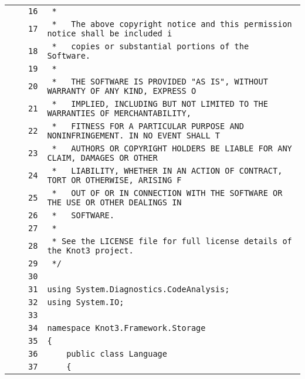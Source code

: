 \documentclass[a4paper,10pt]{article}
\begin{document}
\begin{longtable}[l]{lrrl}
\cellcolor{gray} &  & \verb~16~ & \verb~ *~\\
\cellcolor{gray} &  & \verb~17~ & \verb~ *   The above copyright notice and this permission notice shall be included i~\\
\cellcolor{gray} &  & \verb~18~ & \verb~ *   copies or substantial portions of the Software.~\\
\cellcolor{gray} &  & \verb~19~ & \verb~ *~\\
\cellcolor{gray} &  & \verb~20~ & \verb~ *   THE SOFTWARE IS PROVIDED "AS IS", WITHOUT WARRANTY OF ANY KIND, EXPRESS O~\\
\cellcolor{gray} &  & \verb~21~ & \verb~ *   IMPLIED, INCLUDING BUT NOT LIMITED TO THE WARRANTIES OF MERCHANTABILITY,~\\
\cellcolor{gray} &  & \verb~22~ & \verb~ *   FITNESS FOR A PARTICULAR PURPOSE AND NONINFRINGEMENT. IN NO EVENT SHALL T~\\
\cellcolor{gray} &  & \verb~23~ & \verb~ *   AUTHORS OR COPYRIGHT HOLDERS BE LIABLE FOR ANY CLAIM, DAMAGES OR OTHER~\\
\cellcolor{gray} &  & \verb~24~ & \verb~ *   LIABILITY, WHETHER IN AN ACTION OF CONTRACT, TORT OR OTHERWISE, ARISING F~\\
\cellcolor{gray} &  & \verb~25~ & \verb~ *   OUT OF OR IN CONNECTION WITH THE SOFTWARE OR THE USE OR OTHER DEALINGS IN~\\
\cellcolor{gray} &  & \verb~26~ & \verb~ *   SOFTWARE.~\\
\cellcolor{gray} &  & \verb~27~ & \verb~ *~\\
\cellcolor{gray} &  & \verb~28~ & \verb~ * See the LICENSE file for full license details of the Knot3 project.~\\
\cellcolor{gray} &  & \verb~29~ & \verb~ */~\\
\cellcolor{gray} &  & \verb~30~ & \verb~~\\
\cellcolor{gray} &  & \verb~31~ & \verb~using System.Diagnostics.CodeAnalysis;~\\
\cellcolor{gray} &  & \verb~32~ & \verb~using System.IO;~\\
\cellcolor{gray} &  & \verb~33~ & \verb~~\\
\cellcolor{gray} &  & \verb~34~ & \verb~namespace Knot3.Framework.Storage~\\
\cellcolor{gray} &  & \verb~35~ & \verb~{~\\
\cellcolor{gray} &  & \verb~36~ & \verb~    public class Language~\\
\cellcolor{gray} &  & \verb~37~ & \verb~    {~\\

\end{longtable}
\end{document}
